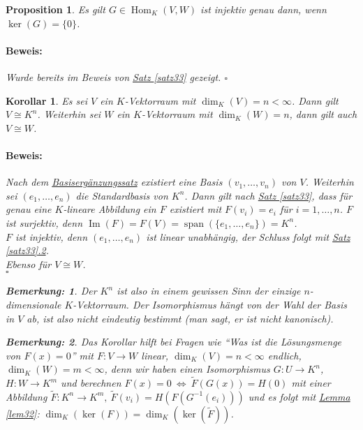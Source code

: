 \documentclass{report}
\DeclareMathOperator{\Span}{span}
\DeclareMathOperator{\Hom}{Hom}
\DeclareMathOperator{\Ima}{Im}
\theoremstyle{customrem}
\newtheorem*{bem}{Bemerkung\textnormal:}
\theoremstyle{customdef}
\newtheorem{proposition}[definition]{Proposition}
\newtheorem{korrolar}[definition]{Korollar}
\renewenvironment{proof}{\vspace{-.75cm}\paragraph{Beweis: }}{\vspace{-.5cm}\hfill$\square$}
\begin{document}
	\begin{proposition}
		Es gilt $G\in\Hom_K(V, W)$ ist injektiv genau dann, wenn $\ker(G)=\{0\}$.\\
		\begin{proof}
			Wurde bereits im Beweis von \hyperref[satz33]{Satz \ref{satz33}} gezeigt. 
		\end{proof}
	\end{proposition}
	\vspace{.25cm}
	\begin{korrolar}
		Es sei $V$ ein $K$-Vektorraum mit $\dim_K(V)=n<\infty$. Dann gilt $V\cong K^n$. Weiterhin sei $W$ ein $K$-Vektorraum mit $\dim_K(W)=n$, dann gilt auch $V\cong W$.\\
		
		\begin{proof}
			Nach dem \hyperref[satz218]{Basisergänzungssatz} existiert eine Basis $(v_1,\ldots, v_n)$ von $V$. Weiterhin sei $(e_1, \ldots, e_n)$ die Standardbasis von $K^n$. Dann gilt nach \hyperref[satz33]{Satz \ref{satz33}}, dass für genau eine $K$-lineare Abbildung ein $F$ existiert mit $F(v_i)=e_i$ für $i=1, \ldots, n$. $F$ ist surjektiv, denn $\Ima(F)=F(V)=\Span(\{e_1, \ldots, e_n\})=K^n$. \\
			$F$ ist injektiv, denn $(e_1, \ldots, e_n)$ ist linear unabhängig, der Schluss folgt mit \hyperref[satz33]{Satz \ref{satz33}.2}.\\
			\noindent Ebenso für $V\cong W$.\\
		\end{proof}
		\vspace{.5cm}
		\begin{bem}
			Der $K^n$ ist also in einem gewissen Sinn der einzige $n$-dimensionale $K$-Vektorraum. Der Isomorphismus hängt von der Wahl der Basis in $V$ ab, ist also nicht eindeutig bestimmt (man sagt, er ist nicht kanonisch).\\
		\end{bem}
		\begin{bem}
			Das Korollar hilft bei Fragen wie "`Was ist die Lösungsmenge von $F(x)=0$"' mit $F:V\to W$ linear, $\dim_K(V) = n<\infty$ endlich, $\dim_K(W) = m<\infty$, denn wir haben einen Isomorphismus $G:U\to K^n$, $H:W\to K^m$ und berechnen $F(x)=0\ \Leftrightarrow\ \tilde{F}(G(x)) = H(0)$ mit einer Abbildung $\tilde{F}:K^n\to K^m,\ \tilde{F}(v_i) = H(F(G^{-1}(e_i)))$ und es folgt mit \hyperref[lem32]{Lemma \ref{lem32}}: $\dim_K(\ker(F)) = \dim_K(\ker(\tilde{F}))$.\\
		\end{bem}
	\end{korrolar}
	
\end{document}
